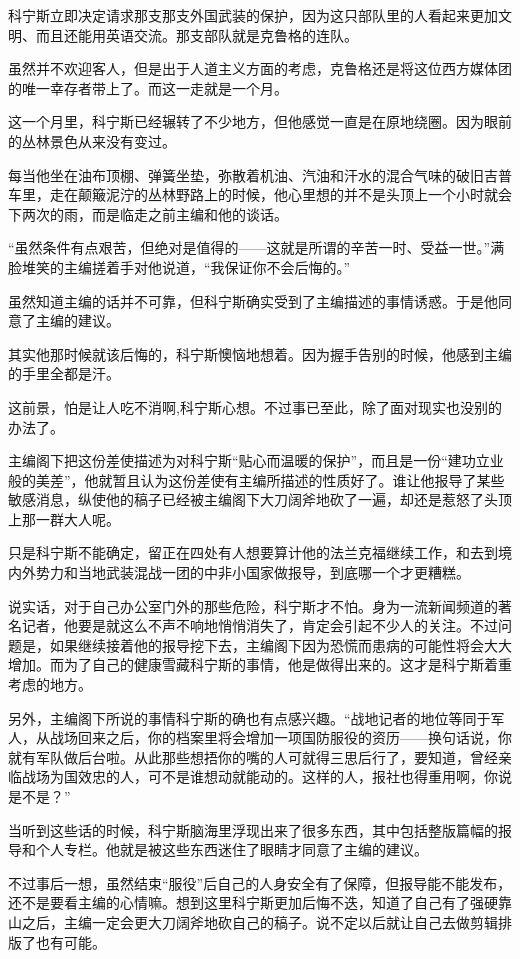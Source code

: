 科宁斯立即决定请求那支那支外国武装的保护，因为这只部队里的人看起来更加文明、而且还能用英语交流。那支部队就是克鲁格的连队。

虽然并不欢迎客人，但是出于人道主义方面的考虑，克鲁格还是将这位西方媒体团的唯一幸存者带上了。而这一走就是一个月。

这一个月里，科宁斯已经辗转了不少地方，但他感觉一直是在原地绕圈。因为眼前的丛林景色从来没有变过。

每当他坐在油布顶棚、弹簧坐垫，弥散着机油、汽油和汗水的混合气味的破旧吉普车里，走在颠簸泥泞的丛林野路上的时候，他心里想的并不是头顶上一个小时就会下两次的雨，而是临走之前主编和他的谈话。

“虽然条件有点艰苦，但绝对是值得的——这就是所谓的辛苦一时、受益一世。”满脸堆笑的主编搓着手对他说道，“我保证你不会后悔的。”

虽然知道主编的话并不可靠，但科宁斯确实受到了主编描述的事情诱惑。于是他同意了主编的建议。

其实他那时候就该后悔的，科宁斯懊恼地想着。因为握手告别的时候，他感到主编的手里全都是汗。

这前景，怕是让人吃不消啊,科宁斯心想。不过事已至此，除了面对现实也没别的办法了。

主编阁下把这份差使描述为对科宁斯“贴心而温暖的保护”，而且是一份“建功立业般的美差”，他就暂且认为这份差使有主编所描述的性质好了。谁让他报导了某些敏感消息，纵使他的稿子已经被主编阁下大刀阔斧地砍了一遍，却还是惹怒了头顶上那一群大人呢。

只是科宁斯不能确定，留正在四处有人想要算计他的法兰克福继续工作，和去到境内外势力和当地武装混战一团的中非小国家做报导，到底哪一个才更糟糕。

说实话，对于自己办公室门外的那些危险，科宁斯才不怕。身为一流新闻频道的著名记者，他要是就这么不声不响地悄悄消失了，肯定会引起不少人的关注。不过问题是，如果继续接着他的报导挖下去，主编阁下因为恐慌而患病的可能性将会大大增加。而为了自己的健康雪藏科宁斯的事情，他是做得出来的。这才是科宁斯着重考虑的地方。

另外，主编阁下所说的事情科宁斯的确也有点感兴趣。“战地记者的地位等同于军人，从战场回来之后，你的档案里将会增加一项国防服役的资历——换句话说，你就有军队做后台啦。从此那些想捂你的嘴的人可就得三思后行了，要知道，曾经亲临战场为国效忠的人，可不是谁想动就能动的。这样的人，报社也得重用啊，你说是不是？”

当听到这些话的时候，科宁斯脑海里浮现出来了很多东西，其中包括整版篇幅的报导和个人专栏。他就是被这些东西迷住了眼睛才同意了主编的建议。

不过事后一想，虽然结束“服役”后自己的人身安全有了保障，但报导能不能发布，还不是要看主编的心情嘛。想到这里科宁斯更加后悔不迭，知道了自己有了强硬靠山之后，主编一定会更大刀阔斧地砍自己的稿子。说不定以后就让自己去做剪辑排版了也有可能。

